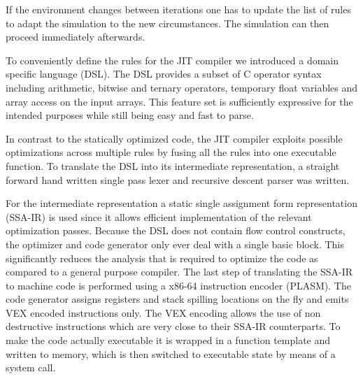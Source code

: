 If the environment changes between iterations one has to update the list of rules to adapt the simulation to the new circumstances.
The simulation can then proceed immediately afterwards.

To conveniently define the rules for the JIT compiler we introduced a domain specific language (DSL). The DSL provides a subset of C operator syntax including arithmetic, bitwise and ternary operators, temporary float variables and array access on the input arrays. This feature set is sufficiently expressive for the intended purposes while still being easy and fast to parse.

In contrast to the statically optimized code, the JIT compiler exploits possible optimizations across multiple rules by fusing all the rules into one executable function. %
To translate the DSL into its intermediate representation, a straight forward hand written single pass lexer and recursive descent parser was written. %

For the intermediate representation a static single assignment form representation (SSA-IR)\cite[Chapter~6.2.4]{dragon}\cite{LuaJITir} is used since it allows efficient implementation of the relevant optimization passes. Because the DSL does not contain flow control constructs, the optimizer and code generator only ever deal with a single basic block. This significantly reduces the analysis that is required to optimize the code as compared to a general purpose compiler. The last step of translating the SSA-IR to machine code is performed using a x86-64 instruction encoder (PLASM). The code generator assigns registers and stack spilling locations on the fly and emits VEX encoded instructions only. The VEX encoding allows the use of non destructive instructions which are very close to their SSA-IR counterparts. To make the code actually executable it is wrapped in a function template and written to memory, which is then switched to executable state by means of a system call.


